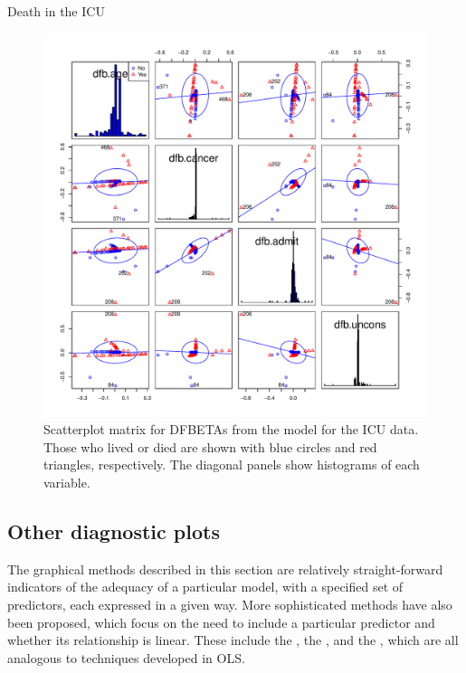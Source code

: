 \documentclass[11pt]{book}\usepackage[]{graphicx}\usepackage[]{color}
\newenvironment{knitrout}{}{} %
\renewenvironment{knitrout}{\small\renewcommand{\baselinestretch}{.85}}{} %
\begin{document}
\begin{Example}[icu2]{Death in the ICU}
\begin{knitrout}
\begin{figure}[!htbp]
\centerline{\includegraphics[width=.9\textwidth]{ch07/fig/icu2-dbscatmat-1} }

\caption[Scatterplot matrix for DFBETAs from the model for the ICU data]{Scatterplot matrix for DFBETAs from the model for the ICU data. Those who lived or died are shown with blue circles and red triangles, respectively. The diagonal panels show histograms of each variable.\label{fig:icu2-dbscatmat}}
\end{figure}


\end{knitrout}


\end{Example}

\subsection{Other diagnostic plots}\label{sec:logist-partial}

The graphical methods described in this section are relatively
straight-forward indicators of the adequacy of a particular model,
with a specified set of predictors, each expressed in a given way.
More sophisticated methods have also been proposed, which focus on the need to include a particular predictor and whether its relationship is linear.
These include the , the
, and the
,
which are all analogous to techniques developed in OLS.
\end{document}
